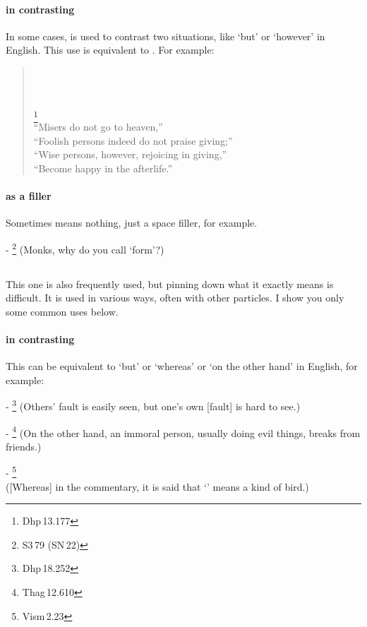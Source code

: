 \paragraph*{ in contrasting} In some cases,  is used to contrast two situations, like `but' or `however' in English. This use is equivalent to . For example:\par
\begin{quote}
\\
\\
\\
\footnote{Dhp\,13.177}\\[1.5mm]
``Misers do not go to heaven,''\\
``Foolish persons indeed do not praise giving;''\\
``Wise persons, however, rejoicing in giving,''\\
``Become happy in the afterlife.''\\
\end{quote}
\paragraph*{ as a filler} Sometimes  means nothing, just a space filler, for example.\par
- \footnote{S3\,79 (SN\,22)} (Monks, why do you call `form'?) \par

\subsection*{}\label{nip:pana}
This one is also frequently used, but pinning down what it exactly means is difficult. It is used in various ways, often with other particles. I show you only some common uses below.
\paragraph*{ in contrasting} This can be equivalent to `but' or `whereas' or `on the other hand' in English, for example:\par
- \footnote{Dhp\,18.252} (Others' fault is easily seen, but one's own [fault] is hard to see.) \par
- \footnote{Thag\,12.610} (On the other hand, an immoral person, usually doing evil things, breaks from friends.) \par
- \footnote{Vism\,2.23} \\([Whereas] in the commentary, it is said that `' means a kind of bird.) \par
